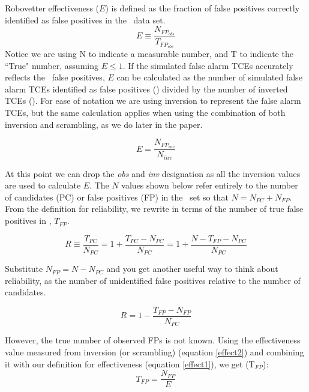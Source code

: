 Robovetter effectiveness ($E$) is defined as the fraction of false positives correctly identified as false positives in the \opstce\ data set. 
\begin{equation}
\label{effect1}
E \equiv \frac{N_{FP_{obs}}}{T_{FP_{obs}}}
\end{equation}
Notice we are using N to indicate a measurable number, and T to indicate the ``True" number, assuming $E\leq 1 $.  If the simulated false alarm TCEs accurately reflects the \opstce\ false positives, $E$ can be calculated as the number of simulated false alarm TCEs identified as false positives (\invfp) divided by the number of inverted TCEs (\invN). For ease of notation we are using inversion to represent the false alarm TCEs, but the same calculation applies when using the combination of both inversion and scrambling, as we do later in the paper.

\begin{equation}
\label{effect2}
E = \frac{N_{FP_{inv}}}{N_{inv}}
\end{equation}

At this point we can drop the \textit{obs} and \textit{inv} designation as all the inversion values are used to calculate $E$. The $N$ values shown below refer entirely to the number of candidates (PC) or false positives (FP) in the \opstce\ set so that $N=N_{PC} + N_{FP}$. From the definition for reliability, we rewrite in terms of the number of true false positives in \opstce, $T_{FP}$.

\begin{equation}
R \equiv \frac{T_{PC}}{N_{PC}} =  1 + \frac{T_{PC}-N_{PC}}{N_{PC}} 
= 1 + \frac{N - T_{FP} - N_{PC}}{N_{PC}}
\end{equation}

Substitute $N_{FP}=N-N_{PC}$ and you get another useful way to think about reliability, as the number of unidentified false positives relative to the number of candidates.

\begin{equation}
\label{eq:rel2}
R = 1 - \frac{T_{FP}-N_{FP}}{N_{PC}}
\end{equation}

However, the true number of observed FPs is not known. Using the effectiveness value measured from inversion (or scrambling) (equation \ref{effect2}) and combining it with our definition for effectiveness (equation \ref{effect1}), we get (T$_{FP}$):
\begin{equation}
T_{FP} = \frac{N_{FP}}{E} 
\end{equation}

